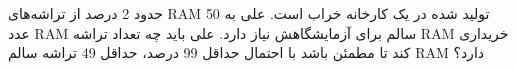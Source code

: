 حدود 2 درصد از تراشه‌های RAM تولید شده در یک کارخانه خراب است. علی به 50 عدد RAM سالم برای آزمایشگاهش نیاز دارد. علی باید چه تعداد تراشه RAM خریداری کند تا مطمئن باشد با احتمال حداقل 99 درصد، حداقل 49 تراشه سالم RAM دارد؟

